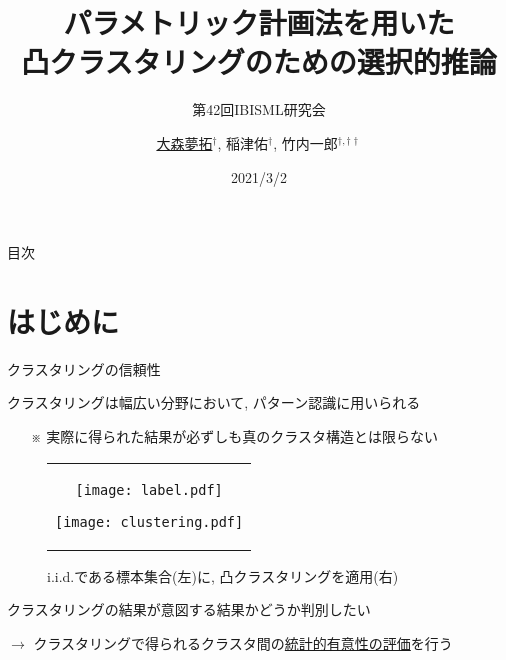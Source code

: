 \documentclass[dvipdfmx, 10pt]{beamer}
\title{パラメトリック計画法を用いた\\凸クラスタリングのための選択的推論}
\subtitle{第42回IBISML研究会}
\author[]{\underline{大森夢拓}$^{\dag}$, 稲津佑$^{\dag}$, 竹内一郎$^{\dag,\dag\dag}$}
\date[]{2021/3/2}
\institute[]{$\dag$: 名古屋工業大学\\
			   $\dag\dag$: 理化学研究所}
\newcommand{\ul}{\underline}
\newcommand{\zl}{\rightarrow}
\begin{document}

\begin{frame}
  \titlepage
\end{frame}


\begin{frame}[noframenumbering]{目次}
    \tableofcontents[hideallsubsections]
    \thispagestyle{empty}%
\end{frame}


\section{はじめに}


\begin{frame}{クラスタリングの信頼性}

    クラスタリングは幅広い分野において, パターン認識に用いられる
    \begin{itemize}
        \item[※] 実際に得られた結果が必ずしも真のクラスタ構造とは限らない
    \end{itemize}

    \begin{figure}
        \begin{tabular}{c}
            \begin{minipage}{0.5\hsize}
                \centering
                \texttt{[image: label.pdf]}
            \end{minipage}
            \begin{minipage}{0.5\hsize}
                \centering
                \texttt{[image: clustering.pdf]}
            \end{minipage}
        \end{tabular}
        \caption{i.i.d.である標本集合(左)に, 凸クラスタリングを適用(右)}
    \end{figure}
    
    クラスタリングの結果が\alert{意図する結果かどうか}判別したい

    $\zl$ クラスタリングで得られるクラスタ間の\ul{統計的有意性の評価}を行う

\end{frame}

\end{document}
